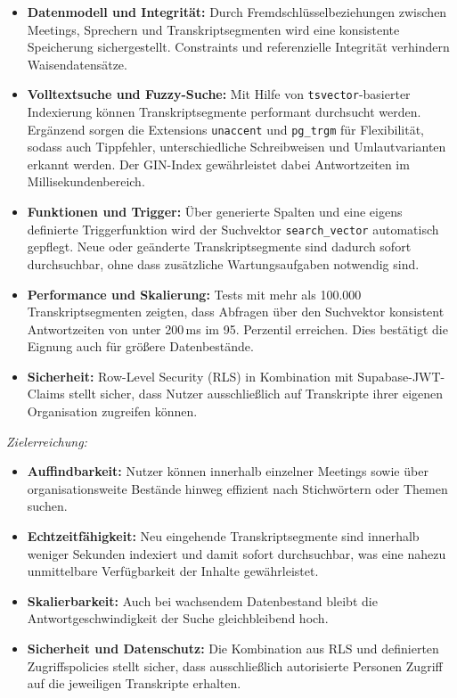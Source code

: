     \begin{itemize}
        \item \textbf{Datenmodell und Integrität:}
        Durch Fremdschlüsselbeziehungen zwischen Meetings, Sprechern und Transkriptsegmenten
        wird eine konsistente Speicherung sichergestellt. Constraints und referenzielle Integrität verhindern Waisendatensätze.

        \item \textbf{Volltextsuche und Fuzzy-Suche:}
         Mit Hilfe von \texttt{tsvector}-basierter Indexierung können
    	Transkriptsegmente performant durchsucht werden. Ergänzend sorgen die
    	Extensions \texttt{unaccent} und \texttt{pg\_trgm} für Flexibilität, sodass
    	auch Tippfehler, unterschiedliche Schreibweisen und Umlautvarianten erkannt
    	werden. Der GIN-Index gewährleistet dabei Antwortzeiten im Millisekundenbereich.

       \item \textbf{Funktionen und Trigger:}
    	Über generierte Spalten und eine eigens definierte Triggerfunktion wird der
    	Suchvektor \texttt{search\_vector} automatisch gepflegt. Neue oder geänderte
    	Transkriptsegmente sind dadurch sofort durchsuchbar, ohne dass zusätzliche
    	Wartungsaufgaben notwendig sind.

    	\item \textbf{Performance und Skalierung:}
    	Tests mit mehr als 100.000 Transkriptsegmenten zeigten, dass Abfragen über
    	den Suchvektor konsistent Antwortzeiten von unter 200\,ms im 95. Perzentil
    	erreichen. Dies bestätigt die Eignung auch für größere Datenbestände.

    	\item \textbf{Sicherheit:}
    	Row-Level Security (\ac{RLS}) in Kombination mit Supabase-\ac{JWT}-Claims
    	stellt sicher, dass Nutzer ausschließlich auf Transkripte ihrer eigenen
    	Organisation zugreifen können.
     \end{itemize}

    \textit{Zielerreichung:}
    \begin{itemize}
        \item \textbf{Auffindbarkeit:}
        Nutzer können innerhalb einzelner Meetings sowie über organisationsweite Bestände hinweg effizient nach Stichwörtern oder Themen suchen.

        \item \textbf{Echtzeitfähigkeit:}
        Neu eingehende Transkriptsegmente sind innerhalb weniger Sekunden indexiert und damit sofort durchsuchbar,
        was eine nahezu unmittelbare Verfügbarkeit der Inhalte gewährleistet.

        \item \textbf{Skalierbarkeit:}
        Auch bei wachsendem Datenbestand bleibt die Antwortgeschwindigkeit der Suche gleichbleibend hoch.

        \item \textbf{Sicherheit und Datenschutz:}
        Die Kombination aus RLS und definierten Zugriffspolicies stellt sicher,
        dass ausschließlich autorisierte Personen Zugriff auf die jeweiligen Transkripte erhalten.
    \end{itemize}

